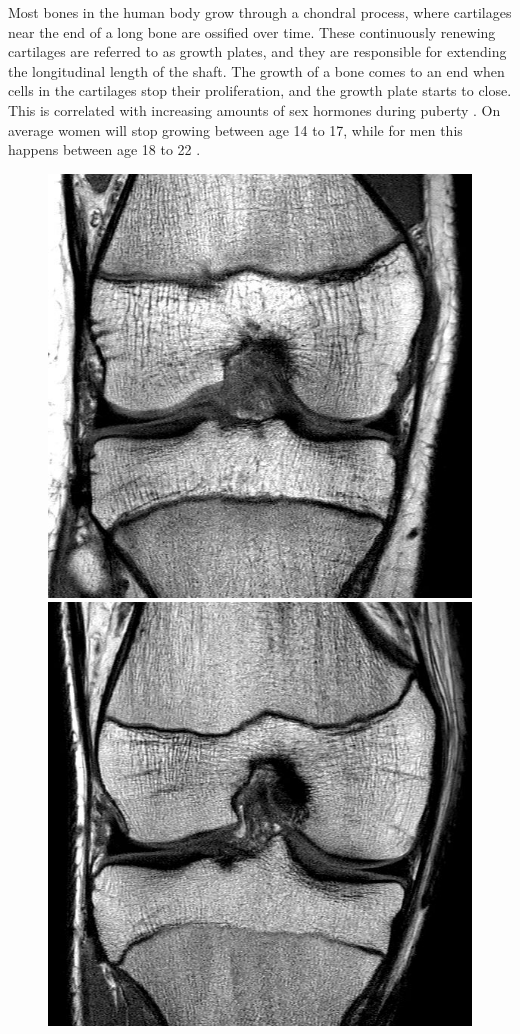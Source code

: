 Most bones in the human body grow through a chondral process, where cartilages near the end of a long bone are ossified over time. These continuously renewing cartilages are referred to as growth plates, and they are responsible for extending the longitudinal length of the shaft. The growth of a bone comes to an end when cells in the cartilages stop their proliferation, and the growth plate starts to close. This is correlated with increasing amounts of sex hormones during puberty \cite{Aumuller2010}. On average women will stop growing between age 14 to 17, while for men this happens between age 18 to 22 \cite{Attarian2013}.

\begin{figure}[!htb]
  \includegraphics[width=\linewidth]{imgs/open-14y.jpg}
\endminipage\hfill
{}
  \includegraphics[width=\linewidth]{imgs/centrally-closed-16y.jpg}

\end{figure}
